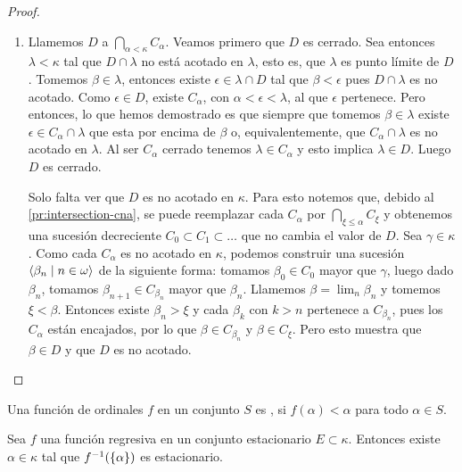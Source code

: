 \begin{proof}
\begin{enumerate}[label=\alph*)]
        \item Llamemos $D$ a $\dint_{\alpha<\kappa}C_\alpha$. Veamos primero que $D$ es cerrado.
            Sea entonces $\lambda<\kappa$ tal que $D\cap\lambda$
            no está acotado en $\lambda$, esto es, que $\lambda$ es punto límite de $D$.
            Tomemos $\beta\in\lambda$,
            entonces existe $\epsilon\in\lambda\cap D$ tal que $\beta<\epsilon$ pues
            $D\cap\lambda$ es no acotado.
            Como $\epsilon\in D$, existe $C_\alpha$, con $\alpha<\epsilon<\lambda$,
            al que $\epsilon$ pertenece.
            Pero entonces, lo que hemos demostrado es que siempre que tomemos $\beta\in\lambda$
            existe $\epsilon\in C_\alpha\cap\lambda$ que esta por encima de $\beta$ o, equivalentemente,
            que $C_\alpha\cap\lambda$ es no acotado en $\lambda$.
            Al ser $C_\alpha$ cerrado tenemos $\lambda\in C_\alpha$ y esto implica
            $\lambda\in D$. Luego $D$ es cerrado.

            Solo falta ver que $D$ es no acotado en $\kappa$.
            Para esto notemos que, debido al \cref{pr:intersection-cna},
            se puede reemplazar cada $C_\alpha$ por $\bigcap_{\xi\leq\alpha} C_\xi$
            y obtenemos una sucesión decreciente $C_0\subset C_1\subset\dots$
            que no cambia el valor de $D$.
            Sea $\gamma\in\kappa$. Como cada $C_\alpha$ es no acotado en $\kappa$,
            podemos construir una sucesión $\langle \beta_n\mid n\in\omega \rangle$ de la siguiente forma:
            tomamos $\beta_0\in C_0$ mayor que $\gamma$, luego dado $\beta_n$, tomamos
            $\beta_{n+1} \in C_{\beta_n}$ mayor que $\beta_n$. Llamemos $\beta = \lim_n\beta_n$
            y tomemos $\xi<\beta$. Entonces existe $\beta_n>\xi$ y cada $\beta_k$ con $k>n$
            pertenece a $C_{\beta_n}$, pues los $C_\alpha$ están encajados,
            por lo que $\beta\in C_{\beta_n}$ y $\beta\in C_\xi$.
            Pero esto muestra que $\beta\in D$ y que $D$ es no acotado.
    \end{enumerate}
\end{proof}

\begin{defi}
    Una función de ordinales $f$ en un conjunto $S$ es , si
    $f(\alpha)<\alpha$ para todo $\alpha\in S$.
\end{defi}

\begin{teo}[Fodor]\label{teo:fodor}
    Sea $f$ una función regresiva en un conjunto estacionario $E\subset\kappa$.
    Entonces existe $\alpha\in\kappa$ tal que $f^{-1}(\left\{ \alpha \right\})$ es estacionario.
\end{teo}

